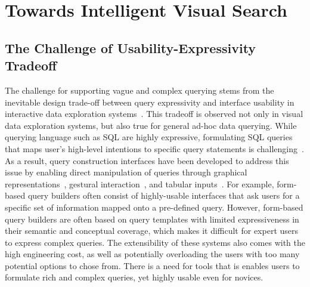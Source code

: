 \section{Towards Intelligent Visual Search}\label{sec:vague}
\subsection{The Challenge of Usability-Expressivity Tradeoff}
\par The challenge for supporting vague and complex querying stems from the inevitable design trade-off between query expressivity and interface usability in interactive data exploration systems~\cite{Jagadish2007,Morton2014}. This tradeoff is observed not only in visual data exploration systems, but also true for general ad-hoc data querying. While querying language such as SQL are highly expressive, formulating SQL queries that maps user's high-level intentions to specific query statements is challenging~\cite{Jagadish2007,Khoussainova2010}. As a result, query construction interfaces have been developed to address this issue by enabling direct manipulation of queries through graphical representations~\cite{Abouzied2012}, gestural interaction~\cite{Nandi2013}, and tabular inputs~\cite{Zloof1975,Embley1989}. For example, form-based query builders often consist of highly-usable interfaces that ask users for a specific set of information mapped onto a pre-defined query. However, form-based query builders are often based on query templates with limited expressiveness in their semantic and conceptual coverage, which makes it difficult for expert users to express complex queries. The extensibility of these systems also comes with the high engineering cost, as well as potentially overloading the users with too many potential options to chose from. There is a need for tools that is enables users to formulate rich and complex queries, yet highly usable even for novices.  

